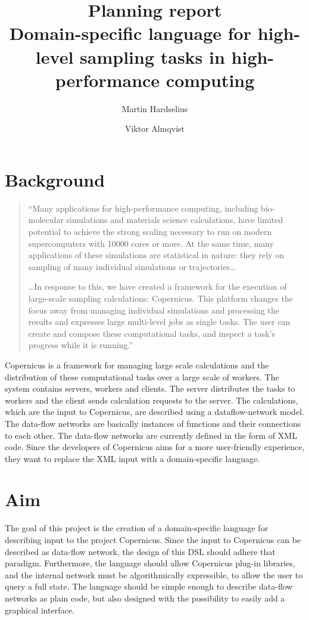 \documentclass[a4paper]{article}
\title{Planning report\\
  \large{Domain-specific language for high-level
  sampling tasks in high-performance computing
  }
}
\author{Martin Hardselius \and Viktor Almqvist}
\date
\begin{document}
\maketitle
\newpage

\section{Background}
\begin{quotation}
  ``Many applications for high-performance computing, including
  bio-molecular simulations and materials science calculations, have
  limited potential to achieve the strong scaling necessary to run on
  modern supercomputers with 10000 cores or more. At the same time,
  many applications of these simulations are statistical in nature:
  they rely on sampling of many individual simulations or
  trajectories\ldots

  \ldots In response to this, we have created a framework for the
  execution of large-scale sampling calculations: Copernicus. This
  platform changes the focus away from managing individual simulations
  and processing the results and expresses large multi-level jobs as
  single tasks. The user can create and compose these computational
  tasks, and inspect a task's progress while it is running.''
\end{quotation}

Copernicus is a framework for managing large scale calculations and
the distribution of these computational tasks over a large scale of
workers. The system contains servers, workers and clients. The server
distributes the tasks to workers and the client sends calculation
requests to the server. The calculations, which are the input to
Copernicus, are described using a dataflow-network model. The
data-flow networks are basically instances of functions and their
connections to each other. The data-flow networks are currently
defined in the form of XML code. Since the developers of Copernicus
aims for a more user-friendly experience, they want to replace the XML
input with a domain-specific language.

\section{Aim}
The goal of this project is the creation of a domain-specific language
for describing input to the project Copernicus. Since the input to
Copernicus can be described as data-flow network, the design of this
DSL should adhere that paradigm. Furthermore, the language should
allow Copernicus plug-in libraries, and the internal network must be
algorithmically expressible, to allow the user to query a full
state. The language should be simple enough to describe data-flow
networks as plain code, but also designed with the possibility to
easily add a graphical interface.
\end{document}
